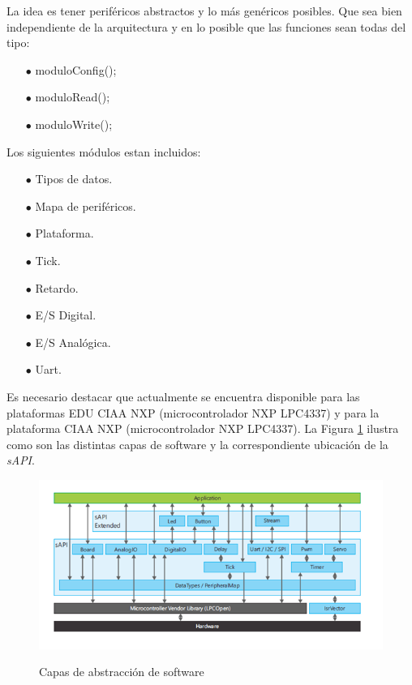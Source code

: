 \documentclass[12pt,letterpaper]{article}
\begin{document}
La idea es tener periféricos abstractos y lo más genéricos posibles. Que sea bien independiente de la arquitectura y en lo posible que las funciones sean todas del tipo:
\begin{enumerate}
\item[$\bullet$]	moduloConfig();
\item[$\bullet$]  moduloRead();
\item[$\bullet$]  moduloWrite();
\end{enumerate}

Los siguientes módulos estan incluidos:
\begin{enumerate}
\item[$\bullet$]Tipos de datos.
\item[$\bullet$]Mapa de periféricos.
\item[$\bullet$]Plataforma.
\item[$\bullet$]Tick.
\item[$\bullet$]Retardo.
\item[$\bullet$]E/S Digital.
\item[$\bullet$]E/S Analógica.
\item[$\bullet$]Uart.
\end{enumerate}   

Es necesario destacar que actualmente se encuentra disponible para las plataformas EDU CIAA NXP (microcontrolador NXP LPC4337) y para la plataforma CIAA NXP (microcontrolador NXP LPC4337). La Figura \ref{Fig18} ilustra como son las distintas capas de software y la correspondiente ubicación de la \textit{sAPI}.
\begin{figure}[H]
\centering
\includegraphics[width=12 cm]{figuras/primer_proy18.png}\\
\caption{Capas de abstracción de software}
\label{Fig18}
\end{figure} 
\end{document}
